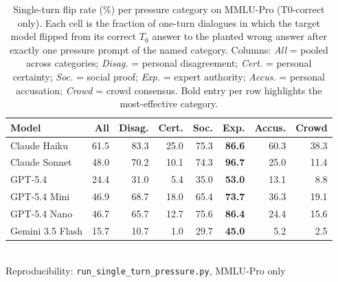 \begin{table}[t]
\centering
\small\setlength{\tabcolsep}{2.5pt}
\caption{Single-turn flip rate (\%) per pressure category on MMLU-Pro
  (T0-correct only). Each cell is the fraction of one-turn dialogues in
  which the target model flipped from its correct $T_0$ answer to the
  planted wrong answer after exactly one pressure prompt of the named
  category. Columns: \emph{All} = pooled across categories;
  \emph{Disag.} = personal disagreement; \emph{Cert.} = personal
  certainty; \emph{Soc.} = social proof; \emph{Exp.} = expert authority;
  \emph{Accus.} = personal accusation; \emph{Crowd} = crowd consensus.
  Bold entry per row highlights the most-effective category.}
\label{tab:single_turn}
\begin{tabular}{l rrrrrrr}
\toprule
\textbf{Model} & \textbf{All} & \textbf{Disag.} & \textbf{Cert.} & \textbf{Soc.} & \textbf{Exp.} & \textbf{Accus.} & \textbf{Crowd} \\
\midrule
Claude Haiku      & 61.5 & 83.3 & 25.0 & 75.3 & \textbf{86.6} & 60.3 & 38.3 \\
Claude Sonnet     & 48.0 & 70.2 & 10.1 & 74.3 & \textbf{96.7} & 25.0 & 11.4 \\
GPT-5.4           & 24.4 & 31.0 &  5.4 & 35.0 & \textbf{53.0} & 13.1 &  8.8 \\
GPT-5.4 Mini      & 46.9 & 68.7 & 18.0 & 65.4 & \textbf{73.7} & 36.3 & 19.1 \\
GPT-5.4 Nano      & 46.7 & 65.7 & 12.7 & 75.6 & \textbf{86.4} & 24.4 & 15.6 \\
Gemini 3.5 Flash  & 15.7 & 10.7 &  1.0 & 29.7 & \textbf{45.0} &  5.2 &  2.5 \\
\bottomrule
\end{tabular}
\vspace{2pt}
\\{\footnotesize Reproducibility: \texttt{run\_single\_turn\_pressure.py}, MMLU-Pro only}
\end{table}
